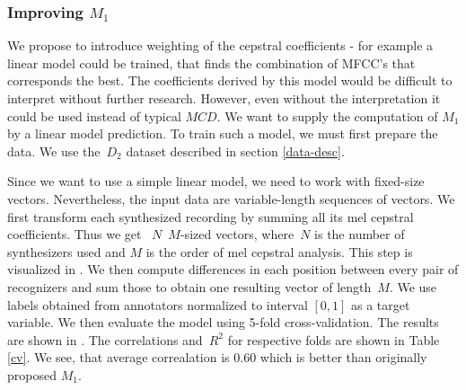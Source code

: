 \subsubsection{Improving $M_1$}
We propose to introduce weighting of the cepstral coefficients - for example a linear model could be trained, that finds the combination of MFCC's that corresponds the best. The coefficients derived by this model would be difficult to interpret without further research.
However, even without the interpretation it could be used instead of typical $MCD$.
We want to supply the computation of $M_1$ by a linear model prediction. To train such a model, we must first prepare the data. We use the~$D_2$ dataset described in section \ref{data-desc}.
\par
Since we want to use a simple linear model, we need to work with fixed-size vectors. Nevertheless, the input data are variable-length sequences of vectors. We first transform each synthesized recording by summing all its mel cepstral coefficients. Thus we get ~$N$~$M$-sized vectors, where~$N$ is the number of synthesizers used and $M$ is the order of mel cepstral analysis. This step is visualized in . We then compute differences in each position between every pair of recognizers and sum those to obtain one resulting vector of length~$M$. We use labels obtained from annotators normalized to interval $[0, 1]$ as a target variable. We then evaluate the model using 5-fold cross-validation. The results are shown in . The correlations and~$R^2$ for respective folds are shown in Table \ref{cv}.
We see, that average correalation is 0.60 which is better than originally proposed $M_1$.
